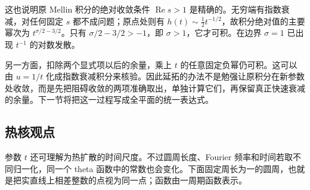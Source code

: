 这也说明原 Mellin 积分的绝对收敛条件 \(\operatorname{Re}s>1\) 是精确的。无穷端有指数衰减，对任何固定 \(s\) 都不成问题；原点处则有 \(h(t)\sim\tfrac12t^{-1/2}\)，故积分绝对值的主要幂次为 \(t^{\sigma/2-3/2}\)。只有 \(\sigma/2-3/2>-1\)，即 \(\sigma>1\)，它才可积。在边界 \(\sigma=1\) 已出现 \(t^{-1}\) 的对数发散。

\ProseParagraphBreak

另一方面，扣除两个显式项以后的余量，乘上 \(t\) 的任意固定负幂仍可积。这可以由 \(u=1/t\) 化成指数衰减积分来核验。因此延拓的办法不是勉强让原积分在新参数处收敛，而是先把阻碍收敛的两项准确取出，单独计算它们，再保留真正快速衰减的余量。下一节将把这一过程写成全平面的统一表达式。

\subsection{热核观点}
\label{b3:subsec:260204}

参数 \(t\) 还可理解为热扩散的时间尺度。不过圆周长度、Fourier 频率和时间若取不同归一化，同一个 theta 函数中的常数也会变化。下面固定周长为一的圆周，也就是把实直线上相差整数的点视为同一点；函数由一周期函数表示。

